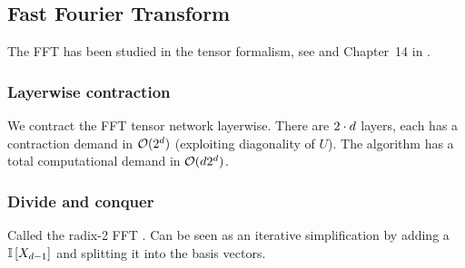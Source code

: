 \subsection{Fast Fourier Transform}

The FFT has been studied in the tensor formalism, see \cite{dolgov_superfast_2012} and Chapter~14 in \cite{hackbusch_tensor_2012}.

\subsubsection{Layerwise contraction}

We contract the FFT tensor network layerwise.
There are $2\cdot d$ layers, each has a contraction demand in $\mathcal{O}(2^{d})$ (exploiting diagonality of $U$).
The algorithm has a total computational demand in $\mathcal{O}(d2^{d})$.

\subsubsection{Divide and conquer}

Called the radix-2 FFT \cite{cooley_algorithm_1965}.
Can be seen as an iterative simplification by adding a $\mathbb{I}\left[X_{d-1}\right]$ and splitting it into the basis vectors.



